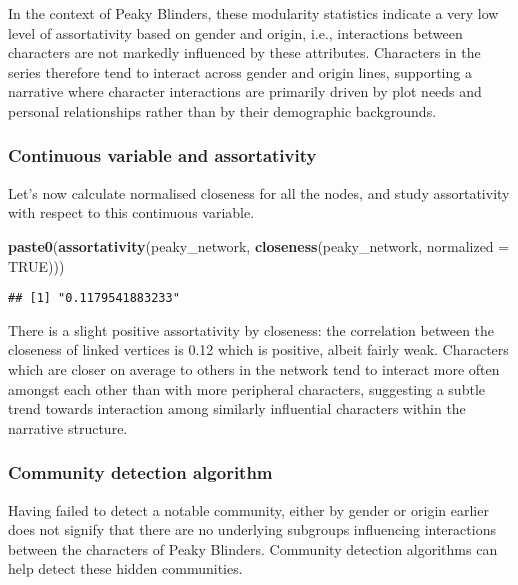 \documentclass[
]{article}
\newenvironment{Shaded}{\begin{snugshade}}{\end{snugshade}}
\newcommand{\AttributeTok}[1]{\textcolor[rgb]{0.13,0.29,0.53}{#1}}
\newcommand{\ConstantTok}[1]{\textcolor[rgb]{0.56,0.35,0.01}{#1}}
\newcommand{\FunctionTok}[1]{\textcolor[rgb]{0.13,0.29,0.53}{\textbf{#1}}}
\newcommand{\NormalTok}[1]{#1}
\begin{document}
In the context of Peaky Blinders, these modularity statistics indicate a
very low level of assortativity based on gender and origin, i.e.,
interactions between characters are not markedly influenced by these
attributes. Characters in the series therefore tend to interact across
gender and origin lines, supporting a narrative where character
interactions are primarily driven by plot needs and personal
relationships rather than by their demographic backgrounds.

\hypertarget{continuous-variable-and-assortativity}{%
\subsubsection{Continuous variable and
assortativity}\label{continuous-variable-and-assortativity}}

Let's now calculate normalised closeness for all the nodes, and study
assortativity with respect to this continuous variable.

\begin{Shaded}
\begin{Highlighting}[]
\FunctionTok{paste0}\NormalTok{(}\FunctionTok{assortativity}\NormalTok{(peaky\_network, }\FunctionTok{closeness}\NormalTok{(peaky\_network, }\AttributeTok{normalized =} \ConstantTok{TRUE}\NormalTok{)))}
\end{Highlighting}
\end{Shaded}

\begin{verbatim}
## [1] "0.1179541883233"
\end{verbatim}

There is a slight positive assortativity by closeness: the correlation
between the closeness of linked vertices is 0.12 which is positive,
albeit fairly weak. Characters which are closer on average to others in
the network tend to interact more often amongst each other than with
more peripheral characters, suggesting a subtle trend towards
interaction among similarly influential characters within the narrative
structure.

\hypertarget{community-detection-algorithm}{%
\subsubsection{Community detection
algorithm}\label{community-detection-algorithm}}

Having failed to detect a notable community, either by gender or origin
earlier does not signify that there are no underlying subgroups
influencing interactions between the characters of Peaky Blinders.
Community detection algorithms can help detect these hidden communities.
\end{document}
